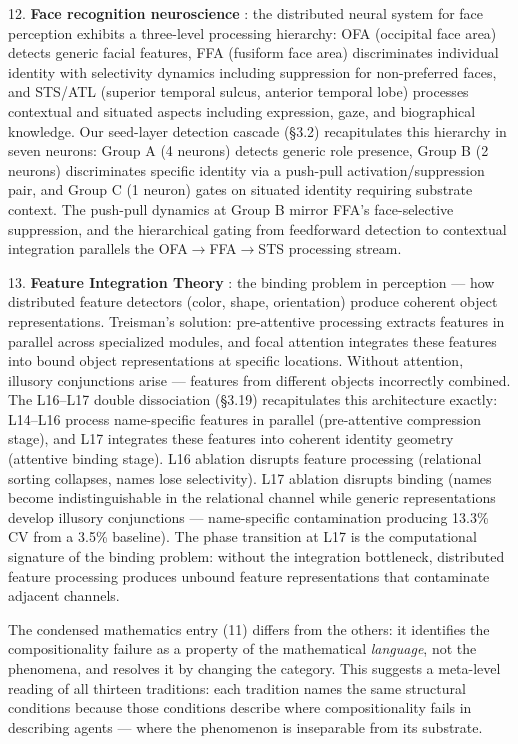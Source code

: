 \documentclass[11pt]{article}
\begin{document}
12. \textbf{Face recognition neuroscience} \citep{haxby2000distributed}: the distributed neural system for face perception exhibits a three-level processing hierarchy: OFA (occipital face area) detects generic facial features, FFA (fusiform face area) discriminates individual identity with selectivity dynamics including suppression for non-preferred faces, and STS/ATL (superior temporal sulcus, anterior temporal lobe) processes contextual and situated aspects including expression, gaze, and biographical knowledge. Our seed-layer detection cascade (§3.2) recapitulates this hierarchy in seven neurons: Group A (4 neurons) detects generic role presence, Group B (2 neurons) discriminates specific identity via a push-pull activation/suppression pair, and Group C (1 neuron) gates on situated identity requiring substrate context. The push-pull dynamics at Group B mirror FFA's face-selective suppression, and the hierarchical gating from feedforward detection to contextual integration parallels the OFA$\rightarrow$FFA$\rightarrow$STS processing stream.

13. \textbf{Feature Integration Theory} \citep{treisman1980feature}: the binding problem in perception --- how distributed feature detectors (color, shape, orientation) produce coherent object representations. Treisman's solution: pre-attentive processing extracts features in parallel across specialized modules, and focal attention integrates these features into bound object representations at specific locations. Without attention, illusory conjunctions arise --- features from different objects incorrectly combined. The L16–L17 double dissociation (§3.19) recapitulates this architecture exactly: L14–L16 process name-specific features in parallel (pre-attentive compression stage), and L17 integrates these features into coherent identity geometry (attentive binding stage). L16 ablation disrupts feature processing (relational sorting collapses, names lose selectivity). L17 ablation disrupts binding (names become indistinguishable in the relational channel while generic representations develop illusory conjunctions --- name-specific contamination producing 13.3\% CV from a 3.5\% baseline). The phase transition at L17 is the computational signature of the binding problem: without the integration bottleneck, distributed feature processing produces unbound feature representations that contaminate adjacent channels.

The condensed mathematics entry (11) differs from the others: it identifies the compositionality failure as a property of the mathematical \textit{language}, not the phenomena, and resolves it by changing the category. This suggests a meta-level reading of all thirteen traditions: each tradition names the same structural conditions because those conditions describe where compositionality fails in describing agents --- where the phenomenon is inseparable from its substrate.
\end{document}
